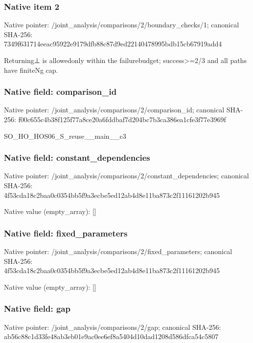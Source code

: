 \documentclass[10pt,a4paper]{article}
\begin{document}
\subsubsection{Native item 2}
Native pointer: /joint\_\allowbreak{}analysis/comparisons/2/boundary\_\allowbreak{}checks/1; canonical SHA-256: 7349f631714eeac95922e9179dfb88c87d9ed22140478995bdb15cb67919add4

\begingroup\raggedright\sloppy Returning{\AtlasUnicodeSymbols ⊥}\allowbreak{} is allowedonly within the failurebudget;\allowbreak{} success>=\allowbreak{}2/\allowbreak{}3 and all paths have finiteNg cap.\par\endgroup

\subsubsection{Native field: comparison\_\allowbreak{}id}
Native pointer: /joint\_\allowbreak{}analysis/comparisons/2/comparison\_\allowbreak{}id; canonical SHA-256: f00c655c4b38f125f77a8ce20a6fddbaf7d204bc7b3ca386ea1cfe3f77e3969f

\begingroup\raggedright\sloppy SO\_\allowbreak{}HO\_\allowbreak{}HOS06\_\allowbreak{}S\_\allowbreak{}reuse\_\allowbreak{}\_\allowbreak{}main\_\allowbreak{}\_\allowbreak{}c3\par\endgroup

\subsubsection{Native field: constant\_\allowbreak{}dependencies}
Native pointer: /joint\_\allowbreak{}analysis/comparisons/2/constant\_\allowbreak{}dependencies; canonical SHA-256: 4f53cda18c2baa0c0354bb5f9a3ecbe5ed12ab4d8e11ba873c2f11161202b945

Native value (empty\_\allowbreak{}array): []

\subsubsection{Native field: fixed\_\allowbreak{}parameters}
Native pointer: /joint\_\allowbreak{}analysis/comparisons/2/fixed\_\allowbreak{}parameters; canonical SHA-256: 4f53cda18c2baa0c0354bb5f9a3ecbe5ed12ab4d8e11ba873c2f11161202b945

Native value (empty\_\allowbreak{}array): []

\subsubsection{Native field: gap}
Native pointer: /joint\_\allowbreak{}analysis/comparisons/2/gap; canonical SHA-256: ab56c88c1d33fe48ab3eb01e9ac0ee6ef8a5404d10dad1208d586dfca54c5807
\end{document}
